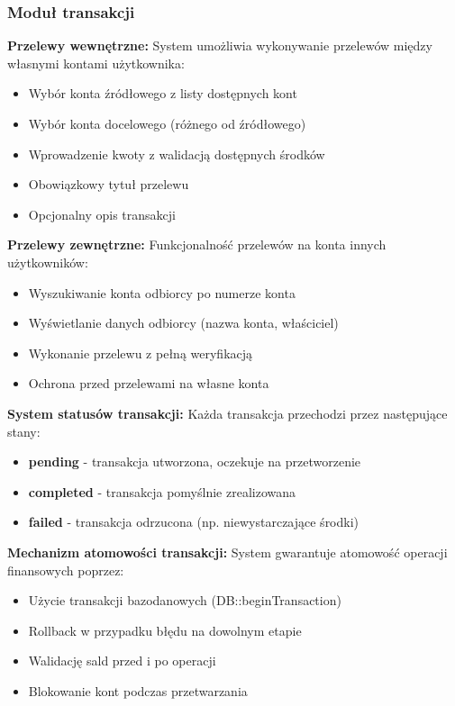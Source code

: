 \documentclass[12pt,a4paper]{article}
\begin{document}
    \subsubsection{Moduł transakcji}

    \textbf{Przelewy wewnętrzne:}
    System umożliwia wykonywanie przelewów między własnymi kontami użytkownika:
    \begin{itemize}
        \item Wybór konta źródłowego z listy dostępnych kont
        \item Wybór konta docelowego (różnego od źródłowego)
        \item Wprowadzenie kwoty z walidacją dostępnych środków
        \item Obowiązkowy tytuł przelewu
        \item Opcjonalny opis transakcji
    \end{itemize}

    \textbf{Przelewy zewnętrzne:}
    Funkcjonalność przelewów na konta innych użytkowników:
    \begin{itemize}
        \item Wyszukiwanie konta odbiorcy po numerze konta
        \item Wyświetlanie danych odbiorcy (nazwa konta, właściciel)
        \item Wykonanie przelewu z pełną weryfikacją
        \item Ochrona przed przelewami na własne konta
    \end{itemize}

    \textbf{System statusów transakcji:}
    Każda transakcja przechodzi przez następujące stany:
    \begin{itemize}
        \item \textbf{pending} - transakcja utworzona, oczekuje na przetworzenie
        \item \textbf{completed} - transakcja pomyślnie zrealizowana
        \item \textbf{failed} - transakcja odrzucona (np. niewystarczające środki)
    \end{itemize}

    \textbf{Mechanizm atomowości transakcji:}
    System gwarantuje atomowość operacji finansowych poprzez:
    \begin{itemize}
        \item Użycie transakcji bazodanowych (DB::beginTransaction)
        \item Rollback w przypadku błędu na dowolnym etapie
        \item Walidację sald przed i po operacji
        \item Blokowanie kont podczas przetwarzania
    \end{itemize}
\end{document}
